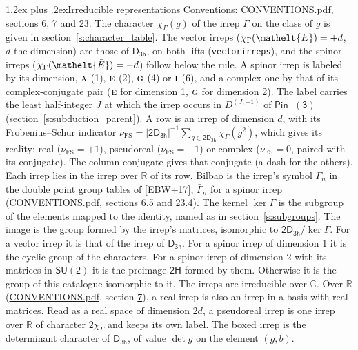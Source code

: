 \documentclass[10pt,a4paper]{article}
\makeatletter
\renewcommand\section{\@startsection{section}{1}{\z@}{-3ex plus -1ex minus -.2ex}%
  {1.2ex plus .2ex}{\normalfont\large\sffamily\bfseries\color{parttitle}}}
\numberwithin{equation}{section}
\newcommand{\eltfont}[1]{{\let\sigma\eltsigma\mathelt{#1}}}
\newcommand{\grp}[1]{\mathsf{#1}}
\newcommand{\irr}[1]{\text{\normalfont\scshape #1}}
\newcommand{\elt}[1]{\eltfont{#1}}
\newcommand{\irrJp}[2]{D^{(#1,#2)}}
\newcommand{\irchar}[1]{\chi_{#1}}
\newcommand{\fsind}{\nu_{\mathrm{FS}}}
\newcommand{\barred}[1]{\bar{#1}}
\makeatother
\begin{document}
\section{Irreducible representations}\label{s:irreps}
Conventions: \href{../../CONVENTIONS.pdf}{CONVENTIONS.pdf}, sections \href{../../../rotation/CONVENTIONS.pdf\#conv.6}{6}, \href{../../../rotation/CONVENTIONS.pdf\#conv.7}{7} and \href{../../CONVENTIONS.pdf\#conv.23}{23}.
\leavevmode\label{n:function.character}\label{n:irrep.Gamma}The character $\irchar{\Gamma}(g)$ of the irrep $\Gamma$ on the class of $g$ is given in section~\ref{s:character_table}. \label{n:index.dimension}The vector irreps ($\irchar{\Gamma}(\elt{\barred{E}}) = +d$, $d$ the dimension) are those of \href{../../../rotation/data/pdf/D3h.pdf}{$\grp{D_{3h}}$}, on both lifts (\texttt{vectorirreps}), and the spinor irreps ($\irchar{\Gamma}(\elt{\barred{E}}) = -d$) follow below the rule. A spinor irrep is labeled by its dimension, $\irr{a}$ (1), $\irr{e}$ (2), $\irr{g}$ (4) or $\irr{i}$ (6), and a complex one by that of its complex-conjugate pair ($\irr{e}$ for dimension 1, $\irr{g}$ for dimension 2). The label carries the least half-integer $J$ at which the irrep occurs in $\irrJp{J}{+1}$ of $\grp{Pin^{-}(3)}$ (section~\ref{s:subduction_parent}).
\leavevmode\label{n:index.frobenius}\label{n:head.irrep}\label{n:head.reality}A row is an irrep of dimension $d$, with its Frobenius--Schur indicator $\fsind = |\grp{2D_{3h}}|^{-1}\allowbreak\sum_{g\in\grp{2D_{3h}}}\irchar{\Gamma}(g^2)$, which gives its reality: real ($\fsind = +1$), pseudoreal ($\fsind = -1$) or complex ($\fsind = 0$, paired with its conjugate). \label{n:head.conjugate}The column conjugate gives that conjugate (a dash for the others). \label{n:head.over.real}Each irrep lies in the irrep over $\mathbb{R}$ of its row. \label{n:head.bilbao}\label{n:irrep.alias.gamma}Bilbao is the irrep's symbol $\Gamma_n$ in the double point group tables of [\href{../../../REFERENCES.pdf\#ref.EBW+17}{EBW+17}], $\bar{\Gamma}_n$ for a spinor irrep (\href{../../CONVENTIONS.pdf}{CONVENTIONS.pdf}, sections \href{../../../rotation/CONVENTIONS.pdf\#conv.6.5}{6.5} and \href{../../CONVENTIONS.pdf\#conv.23.4}{23.4}). \label{n:head.kernel}The kernel $\ker\Gamma$ is the subgroup of the elements mapped to the identity, named as in section~\ref{s:subgroups}. \label{n:head.image}The image is the group formed by the irrep's matrices, isomorphic to $\grp{2D_{3h}}/\ker\Gamma$. For a vector irrep it is that of the irrep of \href{../../../rotation/data/pdf/D3h.pdf}{$\grp{D_{3h}}$}. For a spinor irrep of dimension 1 it is the cyclic group of the characters. For a spinor irrep of dimension 2 with its matrices in $\grp{SU(2)}$ it is the preimage $\grp{2H}$ formed by them. Otherwise it is the group of this catalogue isomorphic to it. The irreps are irreducible over $\mathbb{C}$. Over $\mathbb{R}$ (\href{../../CONVENTIONS.pdf}{CONVENTIONS.pdf}, section \href{../../../rotation/CONVENTIONS.pdf\#conv.7}{7}), a real irrep is also an irrep in a basis with real matrices. Read as a real space of dimension $2d$, a pseudoreal irrep is one irrep over $\mathbb{R}$ of character $2\irchar{\Gamma}$ and keeps its own label. \label{n:mark.determinant}The boxed irrep is the determinant character of \href{../../../rotation/data/pdf/D3h.pdf}{$\grp{D_{3h}}$}, of value $\det g$ on the element $(g, b)$.
\end{document}
